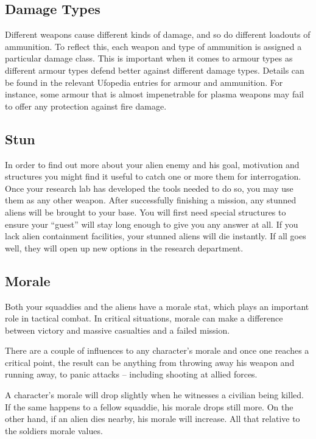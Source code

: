 \subsection{Damage Types}
Different weapons cause different kinds of damage, and so do different loadouts of ammunition. To reflect this, each weapon and type of ammunition is assigned a particular damage class. This is important when it comes to armour types as different armour types defend better against different damage types. Details can be found in the relevant Ufopedia entries for armour and ammunition. For instance, some armour that is almost impenetrable for plasma weapons may fail to offer any protection against fire damage.

\subsection{Stun}
In order to find out more about your alien enemy and his goal, motivation and structures you might find it useful to catch one or more them for interrogation. Once your research lab has developed the tools needed to do so, you may use them as any other weapon. After successfully finishing a mission, any stunned aliens will be brought to your base. You will first need special structures to ensure your ``guest'' will stay long enough to give you any answer at all. If you lack alien containment facilities, your stunned aliens will die instantly. If all goes well, they will open up new options in the research department.

\subsection{Morale}
Both your squaddies and the aliens have a morale stat, which plays an important role in tactical combat. In critical situations, morale can make a difference between victory and massive casualties and a failed mission.

There are a couple of influences to any character's morale and once one reaches a critical point, the result can be anything from throwing away his weapon and running away, to panic attacks -- including shooting at allied forces.

A character's morale will drop slightly when he witnesses a civilian being killed. If the same happens to a fellow squaddie, his morale drops still more.  On the other hand, if an alien dies nearby, his morale will increase. All that relative to the soldiers morale values.

